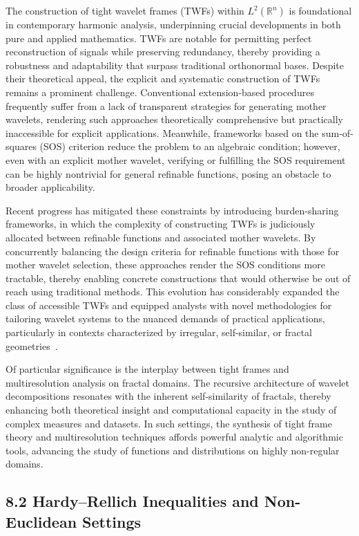 \documentclass[11pt]{article}
\begin{document}
The construction of tight wavelet frames (TWFs) within $L^2(\mathbb{R}^n)$ is foundational in contemporary harmonic analysis, underpinning crucial developments in both pure and applied mathematics. TWFs are notable for permitting perfect reconstruction of signals while preserving redundancy, thereby providing a robustness and adaptability that surpass traditional orthonormal bases. Despite their theoretical appeal, the explicit and systematic construction of TWFs remains a prominent challenge. Conventional extension-based procedures frequently suffer from a lack of transparent strategies for generating mother wavelets, rendering such approaches theoretically comprehensive but practically inaccessible for explicit applications. Meanwhile, frameworks based on the sum-of-squares (SOS) criterion reduce the problem to an algebraic condition; however, even with an explicit mother wavelet, verifying or fulfilling the SOS requirement can be highly nontrivial for general refinable functions, posing an obstacle to broader applicability.

Recent progress has mitigated these constraints by introducing burden-sharing frameworks, in which the complexity of constructing TWFs is judiciously allocated between refinable functions and associated mother wavelets. By concurrently balancing the design criteria for refinable functions with those for mother wavelet selection, these approaches render the SOS conditions more tractable, thereby enabling concrete constructions that would otherwise be out of reach using traditional methods. This evolution has considerably expanded the class of accessible TWFs and equipped analysts with novel methodologies for tailoring wavelet systems to the nuanced demands of practical applications, particularly in contexts characterized by irregular, self-similar, or fractal geometries~\cite{ref104}.

Of particular significance is the interplay between tight frames and multiresolution analysis on fractal domains. The recursive architecture of wavelet decompositions resonates with the inherent self-similarity of fractals, thereby enhancing both theoretical insight and computational capacity in the study of complex measures and datasets. In such settings, the synthesis of tight frame theory and multiresolution techniques affords powerful analytic and algorithmic tools, advancing the study of functions and distributions on highly non-regular domains.

\subsection*{8.2 Hardy--Rellich Inequalities and Non-Euclidean Settings}
\end{document}
